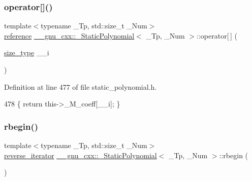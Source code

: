 \subsubsection{\texorpdfstring{operator[]()}{operator[]()}\hspace{0.1cm}{\footnotesize\ttfamily [2/2]}}
{\footnotesize\ttfamily template$<$typename \+\_\+\+Tp, std\+::size\+\_\+t \+\_\+\+Num$>$ \\
\hyperlink{class____gnu__cxx_1_1__StaticPolynomial_a280562caf2d2f392b5b73cac1e64e8ed}{reference} \hyperlink{class____gnu__cxx_1_1__StaticPolynomial}{\+\_\+\+\_\+gnu\+\_\+cxx\+::\+\_\+\+Static\+Polynomial}$<$ \+\_\+\+Tp, \+\_\+\+Num $>$\+::operator\mbox{[}$\,$\mbox{]} (\begin{DoxyParamCaption}\item[{\hyperlink{class____gnu__cxx_1_1__StaticPolynomial_a3384ce6a956ad398fc995e6ee53b2b18}{size\+\_\+type}}]{\+\_\+\+\_\+i }\end{DoxyParamCaption})\hspace{0.3cm}{\ttfamily [inline]}}



Definition at line 477 of file static\+\_\+polynomial.\+h.


\begin{DoxyCode}
478       \{ \textcolor{keywordflow}{return} this->\_M\_coeff[\_\_i]; \}
\end{DoxyCode}
\mbox{\label{class____gnu__cxx_1_1__StaticPolynomial_ac508b08cbd7c83901e4982516a9e8ce9}} 
\subsubsection{\texorpdfstring{rbegin()}{rbegin()}\hspace{0.1cm}{\footnotesize\ttfamily [1/2]}}
{\footnotesize\ttfamily template$<$typename \+\_\+\+Tp, std\+::size\+\_\+t \+\_\+\+Num$>$ \\
\hyperlink{class____gnu__cxx_1_1__StaticPolynomial_ab6a9fab0cd102db2a5bfd00fe9f35e4d}{reverse\+\_\+iterator} \hyperlink{class____gnu__cxx_1_1__StaticPolynomial}{\+\_\+\+\_\+gnu\+\_\+cxx\+::\+\_\+\+Static\+Polynomial}$<$ \+\_\+\+Tp, \+\_\+\+Num $>$\+::rbegin (\begin{DoxyParamCaption}{ }\end{DoxyParamCaption})\hspace{0.3cm}{\ttfamily [inline]}}



